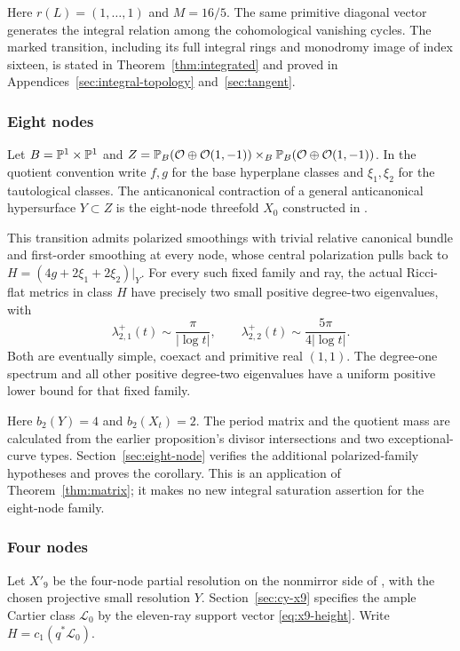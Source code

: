Here $r(L)=(1,\ldots,1)$ and $M=16/5$. The same primitive diagonal
vector generates the integral relation among the cohomological vanishing
cycles. The marked transition, including its full integral rings and
monodromy image of index sixteen, is stated in
Theorem~\ref{thm:integrated} and proved in Appendices~\ref{sec:integral-topology}
and~\ref{sec:tangent}.

\subsubsection*{Eight nodes}
Let $B=\mathbb P^1\times\mathbb P^1$ and
$Z=\mathbb P_B(\mathcal O\oplus\mathcal O(1,-1))\times_B
\mathbb P_B(\mathcal O\oplus\mathcal O(1,-1))$. In the quotient convention write
$f,g$ for the base hyperplane classes and $\xi_1,\xi_2$ for the
tautological classes. The anticanonical contraction of a general
anticanonical hypersurface $Y\subset Z$ is the eight-node threefold
$X_0$ constructed in \cite[Appendix~A, Proposition~A.1]{wuebben-chambers}.

\begin{corollary}\label{cor:eight-node}
This transition admits polarized smoothings with trivial relative
canonical bundle and first-order smoothing at every node, whose central
polarization pulls back to
$H=(4g+2\xi_1+2\xi_2)|_Y$. For every such fixed family and ray,
the actual Ricci-flat metrics in class $H$ have precisely two small
positive degree-two eigenvalues, with
\begin{equation}\label{eq:eight-spectral-law}
 \lambda^+_{2,1}(t)\sim\frac{\pi}{|\log t|},\qquad
 \lambda^+_{2,2}(t)\sim\frac{5\pi}{4|\log t|}.
\end{equation}
Both are eventually simple, coexact and primitive real $(1,1)$.
The degree-one spectrum and all other positive degree-two eigenvalues
have a uniform positive lower bound for that fixed family.
\end{corollary}

Here $b_2(Y)=4$ and $b_2(X_t)=2$. The period matrix and the quotient
mass are calculated from the earlier proposition's divisor intersections
and two exceptional-curve types. Section~\ref{sec:eight-node} verifies
the additional polarized-family hypotheses and proves the corollary.
This is an application of Theorem~\ref{thm:matrix}; it makes no new
integral saturation assertion for the eight-node family.

\subsubsection*{Four nodes}
Let $X'_9$ be the four-node partial resolution on the nonmirror side of
\cite[Section~11.1]{wuebben-cy-mirror}, with the chosen projective
small resolution $Y$. Section~\ref{sec:cy-x9} specifies the ample
Cartier class $\mathcal L_0$ by the eleven-ray support vector
\eqref{eq:x9-height}. Write $H=c_1(q^*\mathcal L_0)$.


